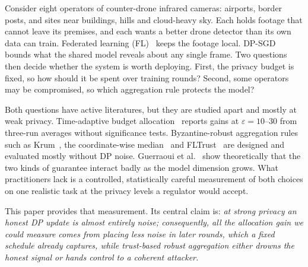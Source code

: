 \documentclass[journal]{IEEEtran}
\newcommand{\eps}{\varepsilon}
\begin{document}
Consider eight operators of counter-drone infrared cameras: airports, border posts, and sites near
buildings, hills and cloud-heavy sky. Each holds footage that cannot leave its premises, and each
wants a better drone detector than its own data can train. Federated learning (FL)~\cite{mcmahan2017fedavg}
keeps the footage local. DP-SGD~\cite{abadi2016dpsgd} bounds what the shared model reveals about
any single frame. Two questions then decide whether the system is worth deploying. First, the
privacy budget is fixed, so how should it be spent over training rounds? Second, some operators may
be compromised, so which aggregation rule protects the model?

Both questions have active literatures, but they are studied apart and mostly at weak privacy.
Time-adaptive budget allocation~\cite{kiani2025timeadaptive} reports gains at $\eps = 10$--$30$
from three-run averages without significance tests. Byzantine-robust aggregation rules such as
Krum~\cite{blanchard2017krum}, the coordinate-wise median~\cite{yin2018median} and
FLTrust~\cite{cao2021fltrust} are designed and evaluated mostly without DP noise. Guerraoui et
al.~\cite{guerraoui2021dpbyz} show theoretically that the two kinds of guarantee interact badly as
the model dimension grows. What practitioners lack is a controlled, statistically careful
measurement of both choices on one realistic task at the privacy levels a regulator would accept.

This paper provides that measurement. Its central claim is: \emph{at strong privacy an honest DP
update is almost entirely noise; consequently, all the allocation gain we could measure comes from
placing less noise in later rounds, which a fixed schedule already captures, while trust-based
robust aggregation either drowns the honest signal or hands control to a coherent attacker.}
\end{document}
